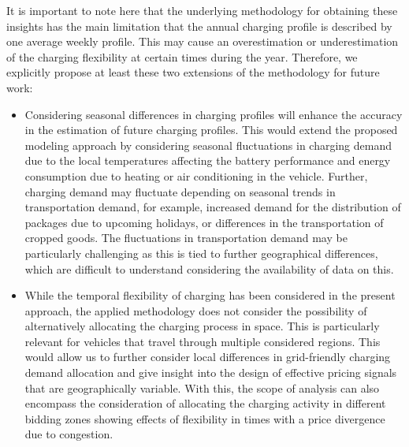 \documentclass[final,10pt]{elsarticle}
\begin{document}
        It is important to note here that the underlying methodology for obtaining these insights has the main limitation that the annual charging profile is described by one average weekly profile. This may cause an overestimation or underestimation of the charging flexibility at certain times during the year. Therefore, we explicitly propose at least these two extensions of the methodology for future work:
        \begin{itemize}
            \item Considering seasonal differences in charging profiles will enhance the accuracy in the estimation of future charging profiles. This would extend the proposed modeling approach by considering seasonal fluctuations in charging demand due to the local temperatures affecting the battery performance and energy consumption due to heating or air conditioning in the vehicle. Further, charging demand may fluctuate depending on seasonal trends in transportation demand, for example, increased demand for the distribution of packages due to upcoming holidays, or differences in the transportation of cropped goods. The fluctuations in transportation demand may be particularly challenging as this is tied to further geographical differences, which are difficult to understand considering the availability of data on this. 
            \item While the temporal flexibility of charging has been considered in the present approach, the applied methodology does not consider the possibility of alternatively allocating the charging process in space. This is particularly relevant for vehicles that travel through multiple considered regions. This would allow us to further consider local differences in grid-friendly charging demand allocation and give insight into the design of effective pricing signals that are geographically variable. With this, the scope of analysis can also encompass the consideration of allocating the charging activity in different bidding zones showing effects of flexibility in times with a price divergence due to congestion. 
            
        \end{itemize} 
\end{document}
